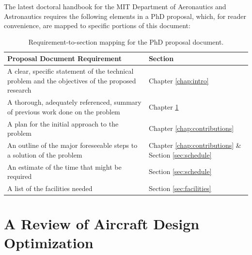 \documentclass[12pt,vi,oneside,table]{report}
\begin{document}
    The latest doctoral handbook for the MIT Department of Aeronautics and Astronautics \cite{mit_aa_doctoral_handbook} requires the following elements in a PhD proposal, which, for reader convenience, are mapped to specific portions of this document:

    \begingroup
    \renewcommand{\arraystretch}{1.8} %
    \begin{table}[H]
        \centering
        \caption{Requirement-to-section mapping for the PhD proposal document.}
        \label{tab:toc}
        \begin{tabular}{m{10cm} m{4cm}}
            \toprule
            \textbf{Proposal Document Requirement}                                                           & \textbf{Section}                                               \\
            \midrule
            A clear, specific statement of the technical problem and the objectives of the proposed research & Chapter \ref{chap:intro} \\
            A thorough, adequately referenced, summary of previous work done on the problem                  & Chapter \ref{chap:literature}                                  \\
            A plan for the initial approach to the problem                                                   & Chapter \ref{chap:contributions}                               \\
            An outline of the major foreseeable steps to a solution of the problem                           & Chapter \ref{chap:contributions} \& Section \ref{sec:schedule} \\
            An estimate of the time that might be required                                                   & Section \ref{sec:schedule}                                     \\
            A list of the facilities needed                                                                  & Section \ref{sec:facilities}                                   \\
            \bottomrule
        \end{tabular}
    \end{table}
    \endgroup


    \chapter{A Review of Aircraft Design Optimization}
    \label{chap:literature}
\end{document}
